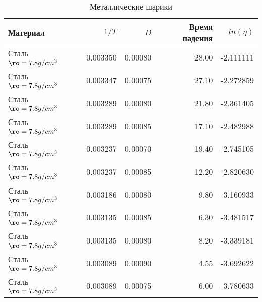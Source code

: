 \begin{table}
\centering
\caption{Металлические шарики}
\begin{tabular}{lrrrr}
\toprule
                Материал &    $1/T$ &     $D$ &  Время падения &  $ln(\eta)$ \\
\midrule
Сталь $\ro = 7.8 g/cm^3$ & 0.003350 & 0.00080 &          28.00 &   -2.111111 \\
Сталь $\ro = 7.8 g/cm^3$ & 0.003347 & 0.00075 &          27.10 &   -2.272859 \\
Сталь $\ro = 7.8 g/cm^3$ & 0.003289 & 0.00080 &          21.80 &   -2.361405 \\
Сталь $\ro = 7.8 g/cm^3$ & 0.003289 & 0.00085 &          17.10 &   -2.482988 \\
Сталь $\ro = 7.8 g/cm^3$ & 0.003237 & 0.00070 &          19.40 &   -2.745105 \\
Сталь $\ro = 7.8 g/cm^3$ & 0.003237 & 0.00085 &          12.20 &   -2.820630 \\
Сталь $\ro = 7.8 g/cm^3$ & 0.003186 & 0.00080 &           9.80 &   -3.160933 \\
Сталь $\ro = 7.8 g/cm^3$ & 0.003135 & 0.00085 &           6.30 &   -3.481517 \\
Сталь $\ro = 7.8 g/cm^3$ & 0.003135 & 0.00080 &           8.20 &   -3.339181 \\
Сталь $\ro = 7.8 g/cm^3$ & 0.003089 & 0.00090 &           4.55 &   -3.692622 \\
Сталь $\ro = 7.8 g/cm^3$ & 0.003089 & 0.00075 &           6.00 &   -3.780633 \\
\bottomrule
\end{tabular}
\end{table}
